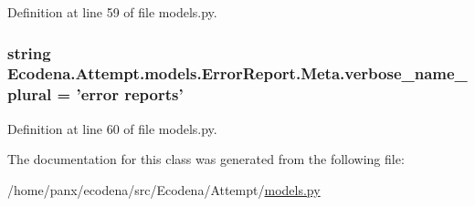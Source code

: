 Definition at line 59 of file models.py.

\hypertarget{class_ecodena_1_1_attempt_1_1models_1_1_error_report_1_1_meta_af5a03ae3d989401f2207e282fe47c680}{
\subsubsection[{verbose\_\-name\_\-plural}]{\setlength{\rightskip}{0pt plus 5cm}string {\bf Ecodena.Attempt.models.ErrorReport.Meta.verbose\_\-name\_\-plural} = 'error reports'}}
\label{d2/d9e/class_ecodena_1_1_attempt_1_1models_1_1_error_report_1_1_meta_af5a03ae3d989401f2207e282fe47c680}


Definition at line 60 of file models.py.



The documentation for this class was generated from the following file:\begin{DoxyCompactItemize}
\item 
/home/panx/ecodena/src/Ecodena/Attempt/\hyperlink{_attempt_2models_8py}{models.py}\end{DoxyCompactItemize}

